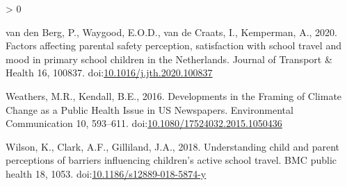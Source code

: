 \documentclass[]{elsarticle} %
\newlength{\cslhangindent}
\newenvironment{CSLReferences}[2] %
 {%
  \setlength{\parindent}{0pt}
  \ifodd #1 \everypar{\setlength{\hangindent}{\cslhangindent}}\ignorespaces\fi
  \ifnum #2 > 0
  \setlength{\parskip}{#2\baselineskip}
  \fi
 }%
 {}
\begin{document}
\begin{CSLReferences}{1}{0}
\leavevmode\hypertarget{ref-vandenbergFactorsAffectingParental2020}{}%
van den Berg, P., Waygood, E.O.D., van de Craats, I., Kemperman, A.,
2020. Factors affecting parental safety perception, satisfaction with
school travel and mood in primary school children in the {Netherlands}.
Journal of Transport \& Health 16, 100837.
doi:\href{https://doi.org/10.1016/j.jth.2020.100837}{10.1016/j.jth.2020.100837}

\leavevmode\hypertarget{ref-weathersDevelopmentsFramingClimate2016}{}%
Weathers, M.R., Kendall, B.E., 2016. Developments in the {Framing} of
{Climate Change} as a {Public Health Issue} in {US Newspapers}.
Environmental Communication 10, 593--611.
doi:\href{https://doi.org/10.1080/17524032.2015.1050436}{10.1080/17524032.2015.1050436}

\leavevmode\hypertarget{ref-wilsonUnderstandingChildParent2018}{}%
Wilson, K., Clark, A.F., Gilliland, J.A., 2018. Understanding child and
parent perceptions of barriers influencing children's active school
travel. BMC public health 18, 1053.
doi:\href{https://doi.org/10.1186/s12889-018-5874-y}{10.1186/s12889-018-5874-y}

\end{CSLReferences}
\end{document}

